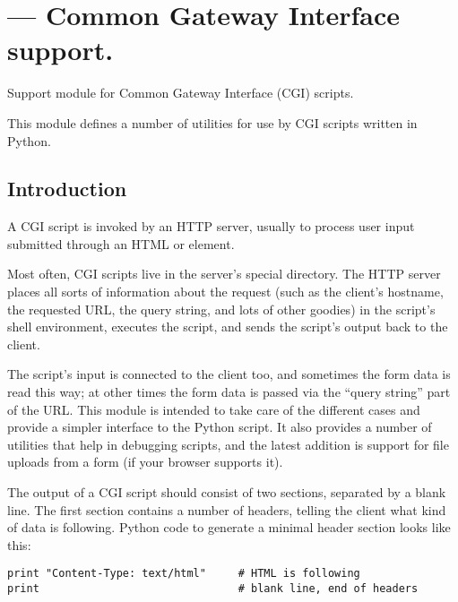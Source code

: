 \section{ ---
         Common Gateway Interface support.}




Support module for Common Gateway Interface (CGI) scripts.%

This module defines a number of utilities for use by CGI scripts
written in Python.

\subsection{Introduction}

A CGI script is invoked by an HTTP server, usually to process user
input submitted through an HTML  or  element.

Most often, CGI scripts live in the server's special 
directory.  The HTTP server places all sorts of information about the
request (such as the client's hostname, the requested URL, the query
string, and lots of other goodies) in the script's shell environment,
executes the script, and sends the script's output back to the client.

The script's input is connected to the client too, and sometimes the
form data is read this way; at other times the form data is passed via
the ``query string'' part of the URL.  This module is intended
to take care of the different cases and provide a simpler interface to
the Python script.  It also provides a number of utilities that help
in debugging scripts, and the latest addition is support for file
uploads from a form (if your browser supports it).

The output of a CGI script should consist of two sections, separated
by a blank line.  The first section contains a number of headers,
telling the client what kind of data is following.  Python code to
generate a minimal header section looks like this:

\begin{verbatim}
print "Content-Type: text/html"     # HTML is following
print                               # blank line, end of headers
\end{verbatim}

